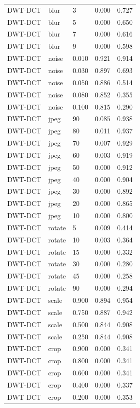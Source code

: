 \begin{table}
\begin{tabular}{lllrr}
DWT-DCT & blur & 3 & 0.000 & 0.727 \\
DWT-DCT & blur & 5 & 0.000 & 0.650 \\
DWT-DCT & blur & 7 & 0.000 & 0.616 \\
DWT-DCT & blur & 9 & 0.000 & 0.598 \\
DWT-DCT & noise & 0.010 & 0.921 & 0.914 \\
DWT-DCT & noise & 0.030 & 0.897 & 0.693 \\
DWT-DCT & noise & 0.050 & 0.886 & 0.514 \\
DWT-DCT & noise & 0.080 & 0.852 & 0.355 \\
DWT-DCT & noise & 0.100 & 0.815 & 0.290 \\
DWT-DCT & jpeg & 90 & 0.085 & 0.938 \\
DWT-DCT & jpeg & 80 & 0.011 & 0.937 \\
DWT-DCT & jpeg & 70 & 0.007 & 0.929 \\
DWT-DCT & jpeg & 60 & 0.003 & 0.919 \\
DWT-DCT & jpeg & 50 & 0.000 & 0.912 \\
DWT-DCT & jpeg & 40 & 0.000 & 0.904 \\
DWT-DCT & jpeg & 30 & 0.000 & 0.892 \\
DWT-DCT & jpeg & 20 & 0.000 & 0.865 \\
DWT-DCT & jpeg & 10 & 0.000 & 0.800 \\
DWT-DCT & rotate & 5 & 0.009 & 0.414 \\
DWT-DCT & rotate & 10 & 0.003 & 0.364 \\
DWT-DCT & rotate & 15 & 0.000 & 0.332 \\
DWT-DCT & rotate & 30 & 0.000 & 0.280 \\
DWT-DCT & rotate & 45 & 0.000 & 0.258 \\
DWT-DCT & rotate & 90 & 0.000 & 0.294 \\
DWT-DCT & scale & 0.900 & 0.894 & 0.954 \\
DWT-DCT & scale & 0.750 & 0.887 & 0.942 \\
DWT-DCT & scale & 0.500 & 0.844 & 0.908 \\
DWT-DCT & scale & 0.250 & 0.844 & 0.908 \\
DWT-DCT & crop & 0.900 & 0.000 & 0.341 \\
DWT-DCT & crop & 0.800 & 0.000 & 0.341 \\
DWT-DCT & crop & 0.600 & 0.000 & 0.341 \\
DWT-DCT & crop & 0.400 & 0.000 & 0.337 \\
DWT-DCT & crop & 0.200 & 0.000 & 0.353 \\

\end{tabular}
\end{table}
